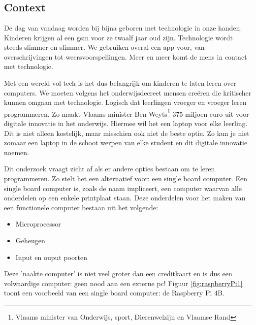 
\chapter{}
\label{ch:inleiding}


\section{Context}

De dag van vandaag worden bij bijna geboren met technologie in onze handen. Kinderen krijgen al een gsm voor ze twaalf jaar oud zijn. Technologie wordt steeds slimmer en slimmer. We gebruiken overal een app voor, van overschrijvingen tot weersvoorspellingen. Meer en meer komt de mens in contact met technologie. 

Met een wereld vol tech is het dus belangrijk om kinderen te laten leren over computers. We moeten volgens het onderwijsdecreet mensen creëren die kritischer kunnen omgaan met technologie. Logisch dat leerlingen vroeger en vroeger leren programmeren. Zo maakt Vlaams minister Ben Weyts\footnote{Vlaams minister van Onderwijs, sport, Dierenwelzijn en Vlaamse Rand} 375 miljoen euro uit voor digitale innovatie in het onderwijs. Hiermee wil het een laptop voor elke leerling. Dit is niet alleen kostelijk, maar misschien ook niet de beste optie. Zo kun je niet zomaar een laptop in de schoot werpen van elke student en dit digitale innovatie noemen.

Dit onderzoek vraagt zicht af als er andere opties bestaan om te leren programmeren. Zo stelt het een alternatief voor: een single board computer. Een single board computer is, zoals de naam impliceert, een computer waarvan alle onderdelen op een enkele printplaat staan.
Deze onderdelen voor het maken van een functionele computer bestaan uit het volgende:
\begin{itemize}
    \item Microprocessor
    \item Geheugen
    \item Input en ouput poorten
\end{itemize} 
Deze 'naakte computer' is niet veel groter dan een creditkaart en is dus een volwaardige computer: geen nood aan een externe pc! Figuur \ref{fig:raspberryPi1} toont een voorbeeld van een single board computer: de Raspberry Pi 4B. 

